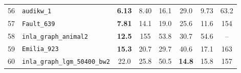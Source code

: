 \begin{footnotesize}
\begin{longtable}{rl cccccc}
56 & \texttt{audikw\_1} & \textbf{6.13} & 8.40 & 16.1 & 29.0 & 9.73 & 63.2 \\
57 & \texttt{Fault\_639} & \textbf{7.81} & 14.1 & 19.0 & 25.6 & 11.6 & 154 \\
58 & \texttt{inla\_graph\_animal2} & \textbf{12.5} & 155 & 53.8 & 30.7 & 54.6 & -- \\
59 & \texttt{Emilia\_923} & \textbf{15.3} & 20.7 & 29.7 & 40.6 & 17.1 & 163 \\
60 & \texttt{inla\_graph\_lgm\_50400\_bw2} & 22.0 & 25.8 & 50.5 & \textbf{14.8} & 15.8 & 157 \\
\end{longtable}
\end{footnotesize}

